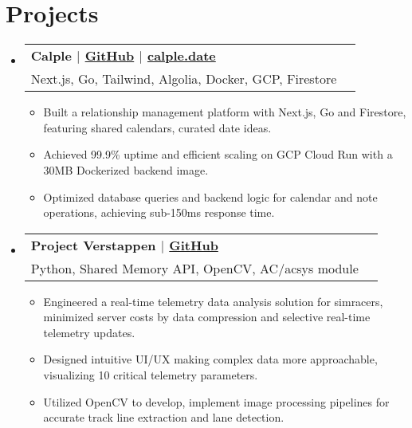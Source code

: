 \documentclass[letterpaper,11pt]{article}
\makeatletter
\newcommand{\resumeItem}[1]{
  \item{
    {#1}
  }
}
\newcommand{\resumeSubheading}[4]{
    \item
    \begin{tabular*}{0.985\textwidth}[t]{l@{\extracolsep{\fill}}r@{\hspace{-0.1in}}}
        {\textbf{#1}} & {#2} \\
        #3 &  #4 \\
    \end{tabular*}\vspace{-5pt}
}
\newcommand{\resumeSubHeadingListStart}{\begin{itemize}[leftmargin=0.00in, rightmargin=-0.2in, label={}]\vspace{3pt}}
\newcommand{\resumeSubHeadingListEnd}{\end{itemize}\vspace{-15pt}}
\newcommand{\resumeItemListStart}{\vspace{3pt}\begin{itemize}[leftmargin=0.15in, rightmargin=0.15in]}
\newcommand{\resumeItemListEnd}{\end{itemize}\vspace{-5pt}}
\makeatother
\begin{document}

\section{Projects}

\resumeSubHeadingListStart
\resumeSubheading
{\textbf{Calple} \textnormal{$|$ \href{https://github.com/juhun32/calple}{GitHub} $|$ \href{https://www.calple.date}{calple.date}}} {}
{{Next.js, Go, Tailwind, Algolia, Docker, GCP, Firestore}}{}
\resumeItemListStart
\resumeItem{Built a relationship management platform with Next.js, Go and Firestore, featuring shared calendars, curated date ideas.}
\resumeItem{Achieved 99.9\% uptime and efficient scaling on GCP Cloud Run with a 30MB Dockerized backend image.}
\resumeItem{Optimized database queries and backend logic for calendar and note operations, achieving sub-150ms response time.}
\resumeItemListEnd
\resumeSubHeadingListEnd

\resumeSubHeadingListStart
\resumeSubheading
{\textbf{Project Verstappen} \textnormal{$|$ \href{https://github.com/juhun32/project-verstappen}{GitHub}}} {}
{{Python, Shared Memory API, OpenCV, AC/acsys module}}{}
\resumeItemListStart
\resumeItem{Engineered a real-time telemetry data analysis solution for simracers, minimized server costs by data compression and selective real-time telemetry updates.}
\resumeItem{Designed intuitive UI/UX making complex data more approachable, visualizing 10 critical telemetry parameters.}
\resumeItem{Utilized OpenCV to develop, implement image processing pipelines for accurate track line extraction and lane detection.}
\resumeItemListEnd
\resumeSubHeadingListEnd

\end{document}
